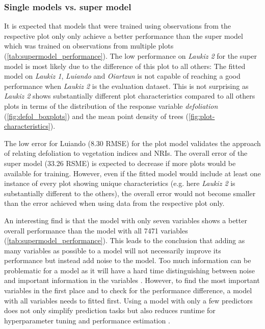 \documentclass[review]{elsarticle}
\begin{document}
\subsubsection{Single models vs. super model}

\noindent It is expected that models that were trained using observations from the respective plot only only achieve a better performance than the super model which was trained on observations from multiple plots (\autoref{tab:supermodel_performance}).
The low performance on \textit{Laukiz 2} for the super model is most likely due to the difference of this plot to all others: The fitted model on \textit{Laukiz 1}, \textit{Luiando} and \textit{Oiartzun} is not capable of reaching a good performance when \textit{Laukiz 2} is the evaluation dataset.
This is not surprising as \textit{Laukiz 2} shows substantially different plot characteristics compared to all others plots in terms of the distribution of the response variable \textit{defoliation} (\autoref{fig:defol_boxplots}) and the mean point density of trees (\autoref{fig:plot-characteristics}).

The low error for Luiando (8.30 RMSE) for the plot model validates the approach of relating defoliation to vegetation indices and NRIs.
The overall error of the super model (33.26 RSME) is expected to decrease if more plots would be available for training.
However, even if the fitted model would include at least one instance of every plot showing unique characteristics (e.g. here \textit{Laukiz 2} is substantially different to the others), the overall error would not become smaller than the error achieved when using data from the respective plot only.

An interesting find is that the model with only seven variables shows a better overall performance than the model with all 7471 variables (\autoref{tab:supermodel_performance}).
This leads to the conclusion that adding as many variables as possible to a model will not necessarily improve its performance but instead add noise to the model.
Too much information can be problematic for a model as it will have a hard time distinguishing between noise and important information in the variables \citep{liFeatureSelectionData2017, guyonIntroductionVariableFeature2003}.
However, to find the most important variables in the first place and to check for the performance difference, a model with all variables needs to fitted first.
Using a model with only a few predictors does not only simplify prediction tasks but also reduces runtime for hyperparameter tuning and performance estimation \citep{liuComputationalMethodsFeature2007}.
\end{document}
